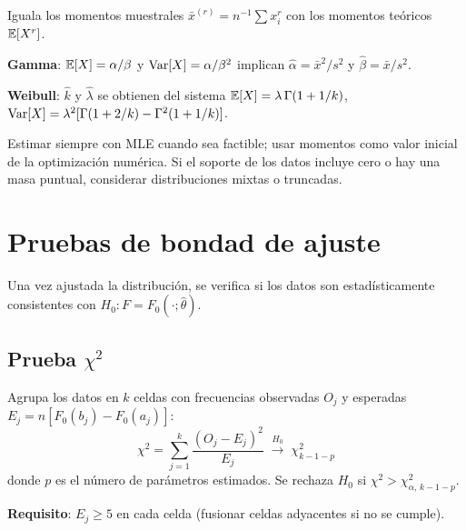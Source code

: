 \documentclass[11pt, letterpaper]{article}
\begin{document}
Iguala los momentos muestrales $\bar x^{(r)} = n^{-1}\sum x_i^r$ con los momentos teóricos $\mathbb{E}[X^r]$.

\textbf{Gamma}: $\mathbb{E}[X] = \alpha/\beta$ y $\operatorname{Var}[X] = \alpha/\beta^2$ implican $\hat\alpha = \bar x^2/s^2$ y $\hat\beta = \bar x/s^2$.

\textbf{Weibull}: $\hat k$ y $\hat\lambda$ se obtienen del sistema $\mathbb{E}[X]=\lambda\,\Gamma(1+1/k)$, $\operatorname{Var}[X]=\lambda^2[\Gamma(1+2/k)-\Gamma^2(1+1/k)]$.

\begin{notabox}
Estimar siempre con MLE cuando sea factible; usar momentos como valor inicial de la optimización numérica. Si el soporte de los datos incluye cero o hay una masa puntual, considerar distribuciones mixtas o truncadas.
\end{notabox}

\section{Pruebas de bondad de ajuste}

Una vez ajustada la distribución, se verifica si los datos son estadísticamente consistentes con $H_0: F = F_0(\cdot;\hat\theta)$.

\subsection{Prueba $\chi^2$}

Agrupa los datos en $k$ celdas con frecuencias observadas $O_j$ y esperadas $E_j = n[F_0(b_j)-F_0(a_j)]$:
\[
\chi^2 = \sum_{j=1}^{k}\frac{(O_j-E_j)^2}{E_j} \;\xrightarrow{H_0}\; \chi^2_{k-1-p}
\]
donde $p$ es el número de parámetros estimados. Se rechaza $H_0$ si $\chi^2 > \chi^2_{\alpha,\,k-1-p}$.

\textbf{Requisito}: $E_j \ge 5$ en cada celda (fusionar celdas adyacentes si no se cumple).
\end{document}
